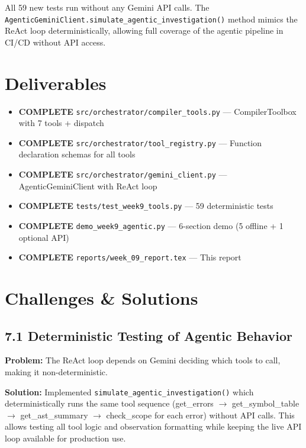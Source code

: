 \documentclass[a4paper,11pt]{article}
\newcommand{\statusgood}[1]{\colorbox{green!20}{\textbf{#1}}}
\begin{document}
All 59 new tests run without any Gemini API calls. The \texttt{AgenticGeminiClient.simulate\_agentic\_investigation()} method mimics the ReAct loop deterministically, allowing full coverage of the agentic pipeline in CI/CD without API access.

\section{Deliverables}

\begin{itemize}[leftmargin=*]
    \item \statusgood{COMPLETE} \texttt{src/orchestrator/compiler\_tools.py} --- CompilerToolbox with 7 tools + dispatch
    \item \statusgood{COMPLETE} \texttt{src/orchestrator/tool\_registry.py} --- Function declaration schemas for all tools
    \item \statusgood{COMPLETE} \texttt{src/orchestrator/gemini\_client.py} --- AgenticGeminiClient with ReAct loop
    \item \statusgood{COMPLETE} \texttt{tests/test\_week9\_tools.py} --- 59 deterministic tests
    \item \statusgood{COMPLETE} \texttt{demo\_week9\_agentic.py} --- 6-section demo (5 offline + 1 optional API)
    \item \statusgood{COMPLETE} \texttt{reports/week\_09\_report.tex} --- This report
\end{itemize}

\section{Challenges \& Solutions}

\subsection{7.1 Deterministic Testing of Agentic Behavior}
\textbf{Problem:} The ReAct loop depends on Gemini deciding which tools to call, making it non-deterministic.

\textbf{Solution:} Implemented \texttt{simulate\_agentic\_investigation()} which deterministically runs the same tool sequence (get\_errors $\rightarrow$ get\_symbol\_table $\rightarrow$ get\_ast\_summary $\rightarrow$ check\_scope for each error) without API calls. This allows testing all tool logic and observation formatting while keeping the live API loop available for production use.
\end{document}
